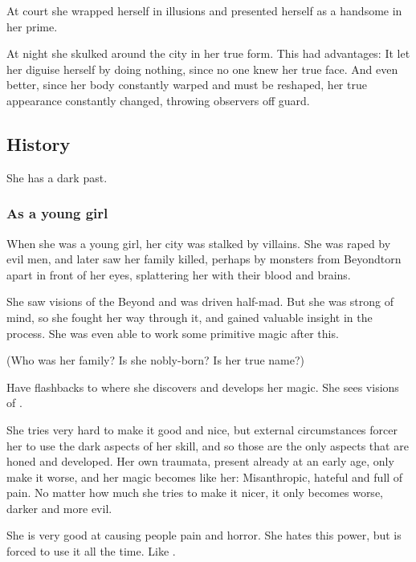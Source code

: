 At court she wrapped herself in illusions and presented herself as a handsome \sphyle{} in her prime. 

At night she skulked around the city in her true form. 
This had advantages: It let her diguise herself by doing nothing, since no one knew her true face. 
And even better, since her body constantly warped and must be reshaped, her true appearance constantly changed, throwing observers off guard. 









\subsection{History}
She has a dark past. 





\subsubsection{As a young girl}
When she was a young girl, her city was stalked by villains. She was raped by evil men, and later saw her family killed, perhaps by monsters from Beyond\dash torn apart in front of her eyes, splattering her with their blood and brains. 

She saw visions of the Beyond and was driven half-mad. 
But she was strong of mind, so she fought her way through it, and gained valuable insight in the process. 
She was even able to work some primitive magic after this.

(Who was her family? Is she nobly-born? Is \MoroCobrel{} her true name?)

Have flashbacks to where she discovers and develops her magic. 
She sees visions of . 

She tries very hard to make it good and nice, but external circumstances forcer her to use the dark aspects of her skill, and so those are the only aspects that are honed and developed. 
Her own traumata, present already at an early age, only make it worse, and her magic becomes like her: 
Misanthropic, hateful and full of pain. 
No matter how much she tries to make it nicer, it only becomes worse, darker and more evil.

She is very good at causing people pain and horror. 
She hates this power, but is forced to use it all the time. 
Like \SailorNothing. 

